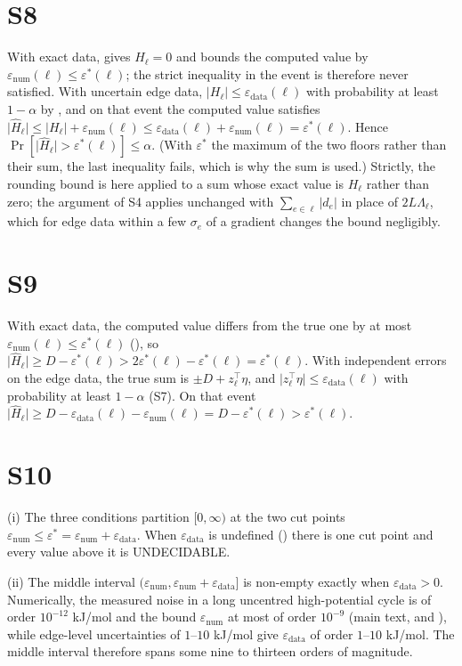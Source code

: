 \documentclass[11pt,a4paper]{article}
\theoremstyle{definition}
\theoremstyle{remark}
\newcommand{\abs}[1]{\lvert#1\rvert}
\newcommand{\eps}{\varepsilon}
\newcommand{\epsnum}{\eps_{\mathrm{num}}}
\newcommand{\epsdata}{\eps_{\mathrm{data}}}
\newcommand{\epsstar}{\eps^{\ast}}
\newcommand{\hol}{H}
\begin{document}
\section*{S8}
With exact data,  gives $\hol_\ell = 0$ and
 bounds the computed value by $\epsnum(\ell) \le
\epsstar(\ell)$; the strict inequality in the event is therefore never
satisfied. With uncertain edge data, $\abs{\hol_\ell} \le \epsdata(\ell)$
with probability at least $1-\alpha$ by , and on
that event the computed value satisfies
$\abs{\widehat{\hol}_\ell}\le\abs{\hol_\ell}+\epsnum(\ell)
\le\epsdata(\ell)+\epsnum(\ell)=\epsstar(\ell)$. Hence
$\Pr[\abs{\widehat{\hol}_\ell}>\epsstar(\ell)]\le\alpha$. (With
$\epsstar$ the maximum of the two floors rather than their sum, the last
inequality fails, which is why the sum is used.) Strictly, the rounding
bound is here applied to a sum whose exact value is $\hol_\ell$ rather
than zero; the argument of S4 applies unchanged with
$\sum_{e\in\ell}\abs{d_e}$ in place of $2L\Lambda_\ell$, which for edge
data within a few $\sigma_e$ of a gradient changes the bound
negligibly.

\section*{S9}
With exact data, the computed value differs from the true one by at most
$\epsnum(\ell)\le\epsstar(\ell)$ (), so
$\abs{\widehat{\hol}_\ell} \ge D - \epsstar(\ell) > 2\epsstar(\ell) -
\epsstar(\ell) = \epsstar(\ell)$. With independent errors on the edge
data, the true sum is $\pm D+z_\ell^{\top}\eta$, and
$\abs{z_\ell^{\top}\eta}\le\epsdata(\ell)$ with probability at least
$1-\alpha$ (S7). On that event
$\abs{\widehat{\hol}_\ell}\ge D-\epsdata(\ell)-\epsnum(\ell)
=D-\epsstar(\ell)>\epsstar(\ell)$.

\section*{S10}
(i) The three conditions partition $[0,\infty)$ at the two cut points
$\epsnum \le \epsstar = \epsnum+\epsdata$. When $\epsdata$ is undefined
() there is one cut point and every value above it is
\textsf{UNDECIDABLE}.

(ii) The middle interval $(\epsnum,\epsnum+\epsdata]$ is non-empty
exactly when $\epsdata>0$. Numerically, the measured noise in a long
uncentred high-potential cycle is of order $10^{-12}$ kJ/mol and the
bound $\epsnum$ at most of order $10^{-9}$ (main text,  and
), while edge-level uncertainties of $1$--$10$
kJ/mol \citep{noor2013,flamholz2012} give $\epsdata$ of order $1$--$10$
kJ/mol. The middle interval therefore spans some nine to thirteen orders
of magnitude.
\end{document}

